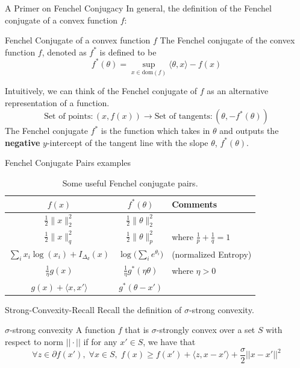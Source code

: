 \begin{frame}{A Primer on Fenchel Conjugacy}
In general, the definition of the Fenchel conjugate of a convex function $f$:
\begin{block}{Fenchel Conjugate of a convex function $f$}
    The Fenchel conjugate of the convex function $f$, denoted as $f^*$ is defined to be\begin{equation}\label{eqn:frenchel_conjugate}
        f^*(\theta) = \sup_{x \in \text{dom}(f)} \langle \theta, x \rangle -f(x)
    \end{equation}
\end{block}
Intuitively, we can think of the Fenchel conjugate of $f$ as an alternative representation of a function.\pause
\begin{equation*}
    \text{Set of points} : (x, f(x)) \to \text{Set of tangents} : (\theta, -f^*(\theta))
\end{equation*}\pause
The Fenchel conjugate $f^*$ is the function which takes in $\theta$ and outputs the \textbf{negative} $y$-intercept of the tangent line with the slope $\theta$, $f^*(\theta)$.
    
\end{frame}

\begin{frame}{Fenchel Conjugate Pairs examples}
\begin{table}[h]
\centering
\renewcommand{\arraystretch}{1.3}
\begin{tabular}{ccl}
\toprule
$f(x)$ & $f^*(\theta)$ & Comments \\
\midrule
$\frac{1}{2}\|x\|_2^2$ & $\frac{1}{2}\|\theta\|_2^2$ & \\
$\frac{1}{2}\|x\|_q^2$ & $\frac{1}{2}\|\theta\|_p^2$ & where $\frac{1}{p} + \frac{1}{q} = 1$ \\
$\sum_i x_i\log(x_i) + I_{\Delta_d}(x)$ & $\log\big(\sum_i e^{\theta_i}\big)$ & (normalized Entropy) \\
$\frac{1}{\eta} g(x)$ & $\frac{1}{\eta} g^*(\eta\theta)$ & where $\eta > 0$ \\
$g(x) + \langle x, x' \rangle$ & $g^*(\theta - x')$ & \\
\bottomrule
\end{tabular}
\caption{Some useful Fenchel conjugate pairs.}
\label{tab:fenchel-pairs}
\end{table}
\end{frame}

\begin{frame}{Strong-Convexity-Recall}
    Recall the definition of $\sigma$-strong convexity. \pause
    \begin{block}{$\sigma$-strong convexity}
        A function $f$ that is $\sigma$-strongly convex over a set $S$ with respect to norm $||\cdot ||$ if for any $x' \in S$, we have that \begin{equation*}
        \forall z \in \partial f(x'),\;\forall x \in S, \; f(x) \geq f(x') + \langle z, x - x' \rangle + \frac{\sigma}{2} || x - x' ||^2
    \end{equation*}
    \end{block}
\end{frame}


